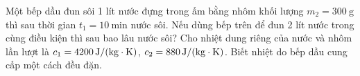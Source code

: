 \begin{ex}
	Một bếp dầu đun sôi 1 lít nước đựng trong ấm bằng nhôm khối lượng $m_2=\SI{300}{\gram}$ thì sau thời gian $t_1=\SI{10}{\minute}$ nước sôi. Nếu dùng bếp trên để đun 2 lít nước trong cùng điều kiện thì sau bao lâu nước sôi? Cho nhiệt dung riêng của nước và nhôm lần lượt là $c_1=\SI{4200}{\joule/\left(\kilogram\cdot\kelvin\right)}$, $c_2=\SI{880}{\joule/\left(\kilogram\cdot\kelvin\right)}$. Biết nhiệt do bếp dầu cung cấp một cách đều đặn.
\end{ex}
